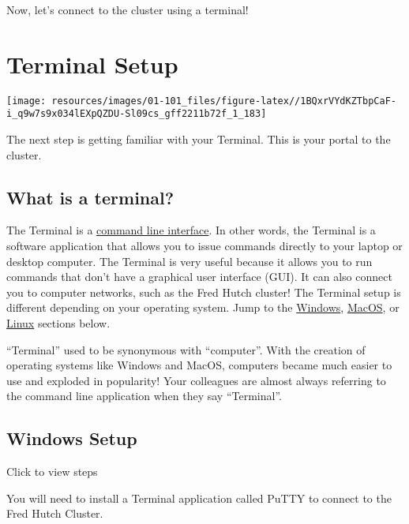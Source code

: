 \documentclass[
]{book}
\begin{document}
Now, let's connect to the cluster using a terminal!

\hypertarget{terminal}{%
\chapter{Terminal Setup}\label{terminal}}

\texttt{[image: resources/images/01-101\_files/figure-latex//1BQxrVYdKZTbpCaF-i\_q9w7s9x034lEXpQZDU-Sl09cs\_gff2211b72f\_1\_183]}

The next step is getting familiar with your Terminal. This is your portal to the cluster.

\hypertarget{what-is-a-terminal}{%
\section{What is a terminal?}\label{what-is-a-terminal}}

The Terminal is a \href{https://www.codecademy.com/article/command-line-interface}{command line interface}. In other words, the Terminal is a software application that allows you to issue commands directly to your laptop or desktop computer. The Terminal is very useful because it allows you to run commands that don't have a graphical user interface (GUI). It can also connect you to computer networks, such as the Fred Hutch cluster! The Terminal setup is different depending on your operating system. Jump to the \protect\hyperlink{windows}{Windows}, \protect\hyperlink{mac}{MacOS}, or \protect\hyperlink{linux}{Linux} sections below.

``Terminal'' used to be synonymous with ``computer''. With the creation of operating systems like Windows and MacOS, computers became much easier to use and exploded in popularity! Your colleagues are almost always referring to the command line application when they say ``Terminal''.

\hypertarget{windows}{%
\section{Windows Setup}\label{windows}}

Click to view steps

You will need to install a Terminal application called PuTTY to connect to the Fred Hutch Cluster.
\end{document}
